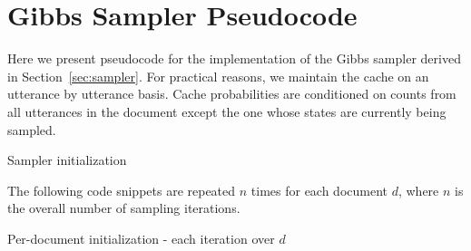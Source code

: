 \newpage
\chapter{Gibbs Sampler Pseudocode} 
Here we present pseudocode for the implementation of the Gibbs sampler derived in Section~\ref{sec:sampler}.  For practical reasons, we maintain the cache on an utterance by utterance basis.  Cache probabilities are conditioned on counts from all utterances in the document except the one whose states are currently being sampled.

\label{sec:pseudocode}

\begin{algorithm}[H]  
\caption{Sampler initialization}
\begin{algorithmic}[1]
    \ENDFOR
\ENDFOR

\end{algorithmic}
\end{algorithm}

The following code snippets are repeated $n$ times for each document $d$,  where $n$ is the overall number of sampling iterations.

\begin{algorithm}[H]  
\caption{Per-document initialization - each iteration over $d$}
\begin{algorithmic}[1]
    \ENDFOR
    \ENDFOR

        \ENDFOR
    \ENDFOR
 
\end{algorithmic}
\end{algorithm}

